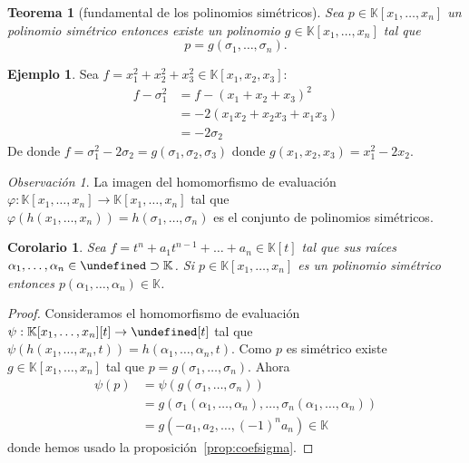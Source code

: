 \documentclass[10pt, spanish]{report}
\newtheorem{tma}{Teorema}[chapter]
\newtheorem{cor}{Corolario}[tma]
\theoremstyle{definition}
\newtheorem*{ej}{Ejemplo}
\theoremstyle{custom}
\theoremstyle{remark}
\newtheorem*{obs}{Observación}
\newcommand{\K}{\mathbb{K}}
\let\L\undefined
\newcommand{\L}{\mathbb{L}}
\begin{document}
\begin{tma}[fundamental de los polinomios simétricos]
    Sea $p \in\K[x_1,\ldots,x_n]$ un polinomio simétrico entonces existe un
    polinomio $g\in\K[x_1,\ldots,x_n]$ tal que \[p=g(\sigma_1,\ldots,\sigma_n).\]   
\end{tma}

\begin{ej}
    Sea $f=x_1^2+x_2^2+x_3^2\in\K[x_1,x_2,x_3]$:
    \begin{align*}
        f-\sigma_1^2&=f-(x_1+x_2+x_3)^2\\
                    &=-2(x_1x_2+x_2x_3+x_1x_3)\\
                    &=-2\sigma_2
    \end{align*}
    De donde $f=\sigma_1^2-2\sigma_2=g(\sigma_1,\sigma_2,\sigma_3)$ donde
    $g(x_1,x_2,x_3)=x_1^2-2x_2$. 
\end{ej}

\begin{obs}
    La imagen del homomorfismo de evaluación $\varphi:\K[x_1,\ldots,x_n]\to
    \K[x_1,\ldots,x_n]$ tal que\\
    $\varphi(h(x_1,\ldots,x_n))=h(\sigma_1,\ldots,\sigma_n)$ es el conjunto de
    polinomios simétricos.
\end{obs}

\begin{cor} \label{cor:polsimetricos}
    Sea $f=t^n+a_1t^{n-1}+\ldots+a_n\in\K[t]$ tal que sus raíces
    $\alpha_1,\ldots,\alpha_n\in\L\supset\K$. Si $p \in\K[x_1,\ldots,x_n]$ es un
    polinomio simétrico entonces $p(\alpha_1,\ldots,\alpha_n)\in\K$.
\end{cor}
\begin{proof}
    Consideramos el homomorfismo de evaluación $\psi:\K[x_1,\ldots,x_n][t]\to
    \L[t]$ tal que $\psi(h(x_1,\ldots,x_n,t))=h(\alpha_1,\ldots,\alpha_n,t)$.
    Como $p$ es simétrico existe $g\in\K[x_1,\ldots,x_n]$ tal que $p=g(\sigma_1,\ldots,\sigma_n)$. Ahora
    \begin{align*}
        \psi(p)&=\psi(g(\sigma_1,\ldots,\sigma_n))\\
        &=g(\sigma_1(\alpha_1,\ldots,\alpha_n),\ldots,\sigma_n(\alpha_1,\ldots,\alpha_n))\\
        &=g(-a_1,a_2,\ldots,(-1)^na_n)\in\K
    \end{align*}
    donde hemos usado la proposición~\ref{prop:coefsigma}.
\end{proof}
\end{document}
